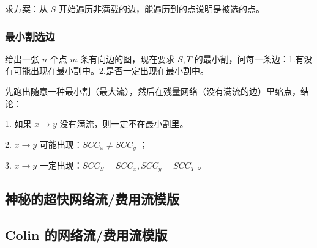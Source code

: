 求方案：从 $S$ 开始遍历非满载的边，能遍历到的点说明是被选的点。



\subsubsection{最小割选边}

给出一张 $n$ 个点 $m$ 条有向边的图，现在要求 $S,T$ 的最小割，问每一条边：1.有没有可能出现在最小割中。2.是否一定出现在最小割中。

先跑出随意一种最小割（最大流），然后在残量网络（没有满流的边）里缩点，结论：

1. 如果 $x\to y$ 没有满流，则一定不在最小割里。

2. $x\to y$ 可能出现：$SCC_x\not=SCC_y$ ；

3. $x\to y$ 一定出现：$SCC_S=SCC_x,SCC_y=SCC_T$ 。

\subsection{神秘的超快网络流/费用流模版}



\subsection{Colin 的网络流/费用流模版}





